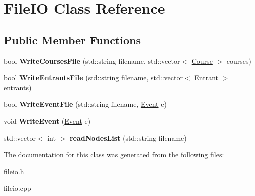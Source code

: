 \hypertarget{classFileIO}{\section{\-File\-I\-O \-Class \-Reference}
\label{classFileIO}
}
\subsection*{\-Public \-Member \-Functions}
\begin{DoxyCompactItemize}
\item 
\hypertarget{classFileIO_ae08f875719305997f40dd2971feae32d}{bool {\bfseries \-Write\-Courses\-File} (std\-::string filename, std\-::vector$<$ \hyperlink{classCourse}{\-Course} $>$ courses)}\label{classFileIO_ae08f875719305997f40dd2971feae32d}

\item 
\hypertarget{classFileIO_a6ae3512e650f4bdf7413d99856f36722}{bool {\bfseries \-Write\-Entrants\-File} (std\-::string filename, std\-::vector$<$ \hyperlink{classEntrant}{\-Entrant} $>$ entrants)}\label{classFileIO_a6ae3512e650f4bdf7413d99856f36722}

\item 
\hypertarget{classFileIO_ac97971c675d1398f98fd9c0ffbb3b278}{bool {\bfseries \-Write\-Event\-File} (std\-::string filename, \hyperlink{classEvent}{\-Event} e)}\label{classFileIO_ac97971c675d1398f98fd9c0ffbb3b278}

\item 
\hypertarget{classFileIO_a5dd25c0348cbb2de0a8b5ad8849362ab}{void {\bfseries \-Write\-Event} (\hyperlink{classEvent}{\-Event} e)}\label{classFileIO_a5dd25c0348cbb2de0a8b5ad8849362ab}

\item 
\hypertarget{classFileIO_a2307b9dbc55e0385337544c856ee16eb}{std\-::vector$<$ int $>$ {\bfseries read\-Nodes\-List} (std\-::string filename)}\label{classFileIO_a2307b9dbc55e0385337544c856ee16eb}

\end{DoxyCompactItemize}


\-The documentation for this class was generated from the following files\-:\begin{DoxyCompactItemize}
\item 
fileio.\-h\item 
fileio.\-cpp\end{DoxyCompactItemize}
